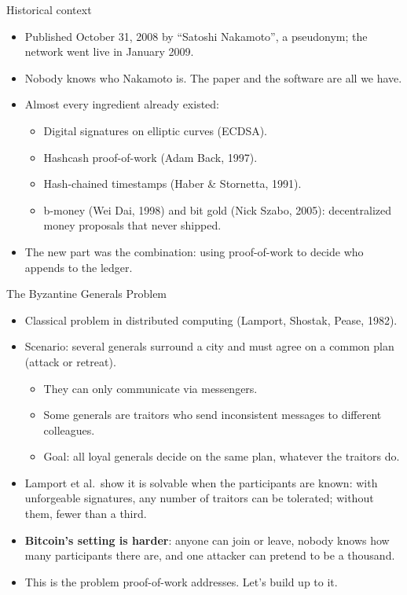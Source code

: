 \ifdefined\PRESENTATION\else\PassOptionsToClass{handout}{beamer}\fi\documentclass[aspectratio=169, lualatex]{beamer}
\begin{document}
\begin{frame}{Historical context}
	\begin{itemize}
		\item Published October 31, 2008 by ``Satoshi Nakamoto'', a pseudonym; the network went live in January 2009.
		\item Nobody knows who Nakamoto is. The paper and the software are all we have.
		\item Almost every ingredient already existed:
		      \begin{itemize}
			      \item Digital signatures on elliptic curves (ECDSA).
			      \item Hashcash proof-of-work (Adam Back, 1997).
			      \item Hash-chained timestamps (Haber \& Stornetta, 1991).
			      \item b-money (Wei Dai, 1998) and bit gold (Nick Szabo, 2005): decentralized money proposals that never shipped.
		      \end{itemize}
		\item The new part was the combination: using proof-of-work to decide who appends to the ledger.
	\end{itemize}
\end{frame}

\begin{frame}{The Byzantine Generals Problem}
	\begin{itemize}
		\item Classical problem in distributed computing (Lamport, Shostak, Pease, 1982).
		\item Scenario: several generals surround a city and must agree on a common plan (attack or retreat).
		      \begin{itemize}
			      \item They can only communicate via messengers.
			      \item Some generals are traitors who send inconsistent messages to different colleagues.
			      \item Goal: all loyal generals decide on the same plan, whatever the traitors do.
		      \end{itemize}
		\item Lamport et al.\ show it is solvable when the participants are known: with unforgeable signatures, any number of traitors can be tolerated; without them, fewer than a third.
		\item \textbf{Bitcoin's setting is harder}: anyone can join or leave, nobody knows how many participants there are, and one attacker can pretend to be a thousand.
		\item This is the problem proof-of-work addresses. Let's build up to it.
	\end{itemize}
\end{frame}
\end{document}
